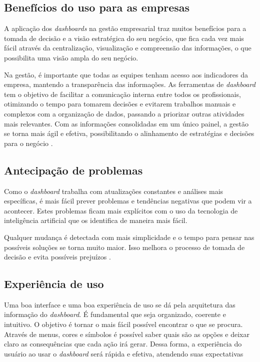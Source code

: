 \subsection{Benefícios do uso para as empresas}

\indent
\par A aplicação dos \textit{dashboards} na gestão empresarial traz muitos benefícios para a tomada de decisão e a visão estratégica do seu negócio, que fica cada vez mais fácil através da centralização,  visualização e compreensão das informações, o que possibilita uma visão ampla do seu negócio.

\par Na gestão, é importante que todas as equipes tenham acesso aos indicadores da empresa, mantendo a transparência das informações. As ferramentas de \textit{dashboard} tem o objetivo de facilitar a comunicação interna entre todos os profissionais, otimizando o tempo para tomarem decisões e evitarem trabalhos manuais e complexos com a organização de dados, passando a priorizar outras atividades mais relevantes. Com as informações consolidadas em um único painel, a gestão se torna mais ágil e efetiva, possibilitando o alinhamento de estratégias e decisões para o negócio \cite{Tecnicon}.

\subsection{Antecipação de problemas}

\indent
\par Como o \textit{dashboard} trabalha com atualizações constantes e análises mais específicas, é mais fácil prever problemas e tendências negativas que podem vir a acontecer. Estes problemas ficam mais explícitos com o uso da tecnologia de inteligência artificial que os identifica de maneira mais fácil.

\par Qualquer mudança é detectada com mais simplicidade e o tempo para pensar nas possíveis soluções se torna muito maior. Isso melhora o processo de tomada de decisão e evita possíveis prejuízos \cite{Systemsat}.

\subsection{Experiência de uso}

\indent
\par Uma boa interface e uma boa experiência de uso se dá pela arquitetura das informação do \textit{dashboard}. É fundamental que seja organizado, coerente e intuitivo. O objetivo é tornar o mais fácil possível encontrar o que se procura. Através de menus, cores e  símbolos é possível saber quais são as opções e deixar claro as consequências que cada ação irá gerar. Dessa forma, a experiência do usuário ao usar o \textit{dashboard} será rápida e efetiva, atendendo suas expectativas \cite{Hostinger}

